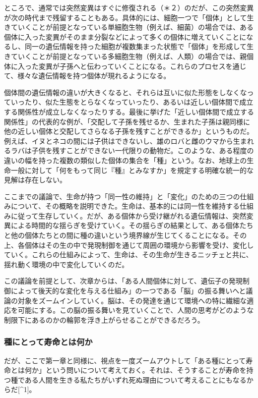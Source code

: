 ところで、通常では突然変異はすぐに修復される（＊２）のだが、この突然変異が次の時代まで残留することもある。具体的には、細胞一つで「個体」として生きていくことが前提となっている単細胞生物（例えば、細菌）の場合では、ある個体に入った変異がそのまま分裂などによって多くの個体に増えていくことになるし、同一の遺伝情報を持った細胞が複数集まった状態で「個体」を形成して生きていくことが前提となっている多細胞生物（例えば、人類）の場合では、親個体に入った変異が子孫へと伝わっていくことになる。これらのプロセスを通じて、様々な遺伝情報を持つ個体が現れるようになる。

個体間の遺伝情報の違いが大きくなると、それらは互いに似た形態をしなくなっていったり、似た生態をとらなくなっていったり、あるいは近しい個体間で成立する関係性が成立しなくなったりする。最後に挙げた「近しい個体間で成立する関係性」の代表的な例が、「交配して子孫を残せるか、生まれた子孫は親同様に他の近しい個体と交配してさらなる子孫を残すことができるか」というものだ。例えば、イヌとネコの間には子供はできないし、雄のロバと雌のウマから生まれるラバは子供を残すことができない一代限りの動物だ。このような、ある程度の違いの幅を持った複数の類似した個体の集合を「種」という。なお、地球上の生命一般に対して「何をもって同じ『種』とみなすか」を規定する明確な統一的な見解は存在しない。

ここまでの議論で、生命が持つ「同一性の維持」と「変化」のための三つの仕組みについて、その概略を説明できた。生命は、基本的には同一性を維持する仕組みに従って生存していく。だが、ある個体から受け継がれる遺伝情報は、突然変異による時間的な揺らぎを受けていく。その揺らぎの結果として、ある個体たちと他の個体たちとの間に種の違いという境界線が生じてくることになる。その上、各個体はその生の中で発現制御を通じて周囲の環境から影響を受け、変化していく。これらの仕組みによって、生命は、その生命が生きるニッチェと共に、揺れ動く環境の中で変化していくのだ。

この議論を前提として、次章からは、「ある人間個体に対して、遺伝子の発現制御によって後天的な変化を与える仕組み」の一つである「脳」の振る舞いへと議論の対象をズームインしていく。脳は、その発達を通じて環境への特に繊細な適応を可能にする。この脳の振る舞いを見ていくことで、人間の思考がどのような制限下にあるのかの輪郭を浮き上がらせることができるだろう。

\subsubsection{種にとって寿命とは何か}\label{ux7a2eux306bux3068ux3063ux3066ux5bffux547dux3068ux306fux4f55ux304b}

だが、ここで第一章と同様に、視点を一度ズームアウトして「ある種にとって寿命とは何か」という問いについて考えておく。それは、そうすることが寿命を持つ種である人間を生きる私たちがいずれ死ぬ理由について考えることにもなるからだ{[}\^{}1{]}。

